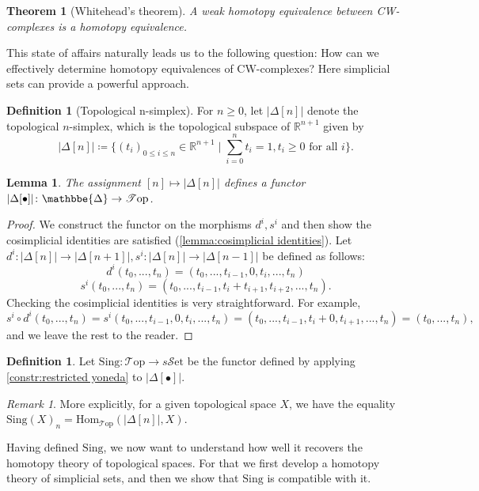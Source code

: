 \documentclass[11pt, a4paper]{amsart}
\def\DDelta{{\mathbbe{\Delta}}}
\newcommand{\DD}{\DDelta}
\newcommand{\bR}{\mathbb{R}}
\newcommand{\Hom}{\mathrm{Hom}}
\newcommand{\sSet}{s\mathscr{S}\mathrm{et}}
\newcommand{\Top}{\mathscr{T}\mathrm{op}}
\newcommand{\Sing}{\mathrm{Sing}}
\newtheorem{theorem}[equation]{Theorem}
\newtheorem{lemma}[equation]{Lemma}
\theoremstyle{definition}
\newtheorem{definition}[equation]{Definition}
\theoremstyle{remark}
\newtheorem{remark}[equation]{Remark}
\numberwithin{equation}{section}
\begin{document}
\begin{theorem}[Whitehead's theorem]
  A weak homotopy equivalence between CW-complexes is a homotopy equivalence.
\end{theorem}

This state of affairs naturally leads us to the following question: How can we effectively determine homotopy equivalences of CW-complexes? Here simplicial sets can provide a powerful approach.

\begin{definition}[Topological n-simplex]
  For $n \geq 0$, let $|\Delta[n]|$ denote the topological $n$-simplex, which is the topological subspace of $\bR^{n+1}$ given by 
  \[|\Delta[n]| \coloneq \{(t_i)_{0 \leq i \leq n} \in \bR^{n+1} \mid \sum_{i = 0}^n t_i = 1, t_i \geq 0 \text{ for all } i \}. \] 
\end{definition}

\begin{lemma} \label{lemma:restricted geometric realization}
  The assignment $[n] \mapsto |\Delta[n]|$ defines a functor $|\Delta[\bullet]|\colon \DD \to \Top$.
\end{lemma}

\begin{proof}
 We construct the functor on the morphisms $d^i,s^i$ and then show the cosimplicial identities are satisfied (\cref{lemma:cosimplicial identities}). Let $d^i\colon |\Delta[n]| \to |\Delta[n+1]|, s^i\colon |\Delta[n]| \to |\Delta[n-1]|$ be defined as follows:
 \[
 d^i(t_0,...,t_n) = (t_0,...,t_{i-1},0,t_i,...,t_n)
 \]
 \[
 s^i(t_0,...,t_n) = (t_0,...,t_{i-1},t_i + t_{i+1},t_{i+2},...,t_n).
 \]
 Checking the cosimplicial identities is very straightforward. For example, 
 \[s^i \circ d^i(t_0,...,t_n) = s^i(t_0,...,t_{i-1},0,t_i,...,t_n) = (t_0,...,t_{i-1},t_i + 0,t_{i+1},...,t_n) = (t_0,...,t_n),\]
 and we leave the rest to the reader.
\end{proof}
 
\begin{definition}
 Let $\Sing\colon \Top \to \sSet$ be the functor defined by applying \cref{constr:restricted yoneda} to $|\Delta[\bullet]|$.
\end{definition}

\begin{remark} \label{rem:sing explicit}
  More explicitly, for a given topological space $X$, we have the equality $\Sing(X)_n = \Hom_{\Top}(|\Delta[n]|,X)$.
\end{remark}

Having defined $\Sing$, we now want to understand how well it recovers the homotopy theory of topological spaces. For that we first develop a homotopy theory of simplicial sets, and then we show that $\Sing$ is compatible with it.
\end{document}
